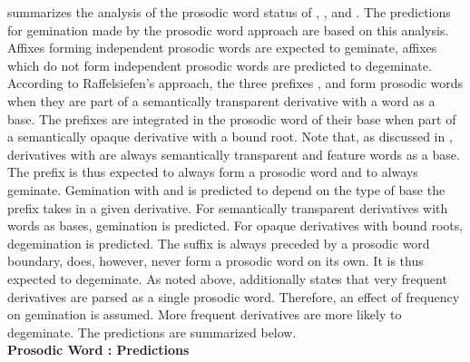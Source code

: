  summarizes the analysis of the prosodic word status of  , ,  and . The predictions for gemination made by the prosodic word approach are based on this analysis. Affixes forming independent prosodic words are expected to geminate, affixes which do not form independent prosodic words are predicted to degeminate.
According to Raffelsiefen's approach, the three prefixes ,  and  form prosodic words when they are part of a semantically transparent derivative with a word as a base. The prefixes are integrated in the prosodic word of their base when part of a semantically opaque derivative with a bound root. 
Note that, as discussed in , derivatives with  are always semantically transparent and feature words as a base. The prefix  is thus expected to always form a prosodic word and to always geminate. 
Gemination with  and  is predicted to depend on the type of base the prefix takes in a given derivative. For semantically transparent derivatives with words as bases, gemination is predicted. For opaque derivatives with bound roots, degemination is predicted.
The suffix  is always preceded by a prosodic word boundary, does, however, never form a prosodic word on its own. It is thus expected to degeminate. 
As noted above, \cite{Raffelsiefen.1999} additionally states that very frequent derivatives are parsed as a single prosodic word. Therefore, an effect of frequency on gemination is assumed. More frequent derivatives are more likely to degeminate. The predictions are summarized below.\\



\textbf{Prosodic Word \citep{Raffelsiefen.1999}: Predictions}

